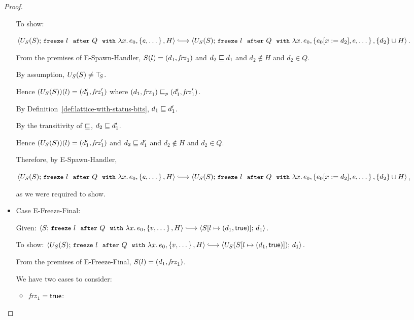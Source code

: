 \begin{proof}
\begin{itemize}
      To show:

      $\config{U_S(S)}{\freezeafterfull{l}{Q}{\lam{x}{e_0}}{\setof{e,
            \dots}}{H}} \parstepsto \\
      \config{U_S(S)}{\freezeafterfull{l}{Q}{\lam{x}{e_0}}{\setof{\subst{e_0}{x}{d_2},
            e, \dots}} {\{d_2\}\cup H}}$.

      From the premises of {\sc E-Spawn-Handler}, $S(l) =
      (d_1, \mathit{frz}_1)$ and $d_2 \sqsubseteq d_1$ and $d_2 \notin
      H$ and $d_2 \in Q$.

      By assumption, $U_S(S) \neq \top\hspace{-0.85mm}_{S}$.

      Hence $(U_S(S))(l) = (d'_1, \mathit{frz}'_1)$ where
      $(d_1, \mathit{frz}_1) \sqsubseteq_p (d'_1, \mathit{frz}'_1)$.

      By Definition~\ref{def:lattice-with-status-bits}, $d_1 \sqsubseteq
      d'_1$.

      By the transitivity of $\sqsubseteq$, $d_2 \sqsubseteq d'_1$.

      Hence $(U_S(S))(l) = (d'_1, \mathit{frz}'_1)$ and $d_2 \sqsubseteq
      d'_1$ and $d_2 \notin H$ and $d_2 \in Q$.

      Therefore, by {\sc E-Spawn-Handler},

      $\config{U_S(S)}{\freezeafterfull{l}{Q}{\lam{x}{e_0}}{\setof{e,
            \dots}}{H}} \parstepsto \\
      \config{U_S(S)}{\freezeafterfull{l}{Q}{\lam{x}{e_0}}{\setof{\subst{e_0}{x}{d_2},
            e, \dots}} {\{d_2\}\cup H}}$,

      as we were required to show.

    \item Case {\sc E-Freeze-Final}:

      Given:
      $\config{S}{\freezeafterfull{l}{Q}{\lam{x}{e_0}}{\setof{v,
            \dots}}{H}} \parstepsto \\
      \config{\extS{S}{l}{d_1}{\frozentrue}}{d_1}$.

      To show:
      $\config{U_S(S)}{\freezeafterfull{l}{Q}{\lam{x}{e_0}}{\setof{v,
            \dots}}{H}} \parstepsto \\
      \config{U_S(\extS{S}{l}{d_1}{\frozentrue})}{d_1}$.

      From the premises of {\sc E-Freeze-Final}, $S(l) =
      (d_1, \mathit{frz}_1)$.

      We have two cases to consider:
      \begin{itemize}
        \item $\mathit{frz}_1 = \textsf{true}$:


\end{itemize}
\end{itemize}
\end{proof}

